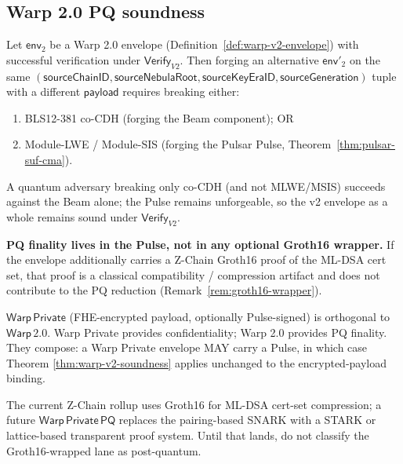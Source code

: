 
\subsection*{Warp 2.0 PQ soundness}

\begin{theorem}
\label{thm:warp-v2-soundness}
Let $\mathsf{env}_2$ be a Warp 2.0 envelope
(Definition~\ref{def:warp-v2-envelope}) with successful verification
under $\mathsf{Verify}_{V2}$. Then forging an alternative $\mathsf{env}'_2$
on the same $(\mathsf{sourceChainID}, \mathsf{sourceNebulaRoot},
\mathsf{sourceKeyEraID}, \mathsf{sourceGeneration})$ tuple with a
different $\mathsf{payload}$ requires breaking either:
\begin{enumerate}[nosep]
  \item BLS12-381 co-CDH (forging the Beam component); OR
  \item Module-LWE / Module-SIS (forging the Pulsar Pulse,
        Theorem~\ref{thm:pulsar-suf-cma}).
\end{enumerate}
A quantum adversary breaking only co-CDH (and not MLWE/MSIS) succeeds
against the Beam alone; the Pulse remains unforgeable, so the v2
envelope as a whole remains sound under $\mathsf{Verify}_{V2}$.

\textbf{PQ finality lives in the Pulse, not in any optional Groth16
wrapper.} If the envelope additionally carries a Z-Chain Groth16 proof
of the ML-DSA cert set, that proof is a classical compatibility /
compression artifact and does not contribute to the PQ reduction
(Remark~\ref{rem:groth16-wrapper}).
\end{theorem}

\begin{remark}
$\mathsf{Warp\,Private}$ (FHE-encrypted payload, optionally
Pulse-signed) is orthogonal to $\mathsf{Warp\,2.0}$. Warp Private
provides confidentiality; Warp 2.0 provides PQ finality. They compose:
a Warp Private envelope MAY carry a Pulse, in which case Theorem
\ref{thm:warp-v2-soundness} applies unchanged to the encrypted-payload
binding.
\end{remark}

\begin{remark}
The current Z-Chain rollup uses Groth16 for ML-DSA cert-set
compression; a future $\mathsf{Warp\,Private\,PQ}$ replaces the
pairing-based SNARK with a STARK or lattice-based transparent proof
system. Until that lands, do not classify the Groth16-wrapped lane as
post-quantum.
\end{remark}

